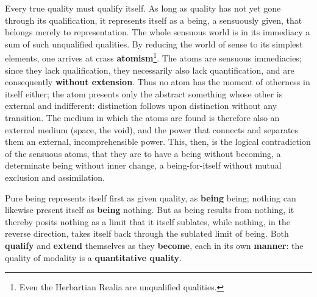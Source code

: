 \documentclass[12pt,a4paper,openany]{book}
\newcommand{\opage}[1]{\marginnote{\footnotesize\textit{[#1]}}}
\begin{document}
Every true quality must qualify itself. As long as quality has not yet gone through its qualification, it represents itself as a being, a sensuously given, that belongs merely to representation. The whole sensuous world is in its immediacy a sum of such unqualified qualities. By reducing the world of sense to its simplest elements, one arrives at crass \textbf{atomism}\footnote{Even the Herbartian Realia are unqualified qualities.}. The atoms are sensuous immediacies; since they lack qualification, they necessarily also lack quantification, and are consequently \textbf{without extension}. Thus no atom has the moment of otherness in itself either; the atom presents only the abstract something whose other is external and indifferent: distinction follows upon distinction without any transition. The medium in which the atoms are found is therefore also an external medium (space, the void), and the power that connects and separates them an external, incomprehensible power. This, then, is the logical contradiction of the sensuous atoms,
\setcounter{footnote}{0}%
\opage{54}that they are to have a being without becoming, a determinate being without inner change, a being-for-itself without mutual exclusion and assimilation.

Pure being represents itself first as given quality, as \textbf{being} being; nothing can likewise present itself as \textbf{being} nothing. But as being results from nothing, it thereby posits nothing as a limit that it itself sublates, while nothing, in the reverse direction, takes itself back through the sublated limit of being. Both \textbf{qualify} and \textbf{extend} themselves as they \textbf{become}, each in its own \textbf{manner}: the quality of modality is a \textbf{quantitative quality}.
\end{document}

